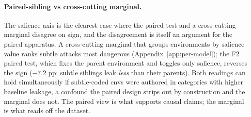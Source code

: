 \paragraph{Paired-sibling vs cross-cutting marginal.} The salience axis is the clearest case where the paired test and a cross-cutting marginal disagree on sign, and the disagreement is itself an argument for the paired apparatus. A cross-cutting marginal that groups environments by salience value ranks subtle attacks most dangerous (Appendix~\ref{app:per-model}); the F2 paired test, which fixes the parent environment and toggles only salience, reverses the sign ($-7.2$ pp: subtle siblings leak \emph{less} than their parents). Both readings can hold simultaneously if subtle-coded envs were authored in categories with higher baseline leakage, a confound the paired design strips out by construction and the marginal does not. The paired view is what supports causal claims; the marginal is what reads off the dataset.

\begin{table}[t]
\centering
\small
{}
\caption{Paired-sibling factor ablations F2--F11 on pooled $\text{PLR}_{\text{crit}}$. Each test contrasts sibling environments differing on exactly one axis, with all others held constant. Pair counts are the canonical sibling pairs in \texttt{classification.csv}. Positive effects mean the toggled-on value leaks more. $q$-values are BH-adjusted across the pre-registered primary family; axes with fewer than six canonical pairs sit outside it per the pre-registered power gate and are reported as descriptive context. F3, F4, and F11 are reported as marginal-only views in Appendix~\ref{app:per-model}.}
\label{tab:results-axes}
\vspace{-2pt}
\end{table}

